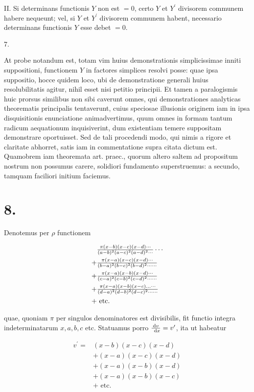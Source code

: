 \documentclass[twoside,12pt, showframe]{memoir}
\let\oldfrac\frac
\def\frac#1#2{\mathchoice{\tfrac{#1}{#2}}{\oldfrac{#1}{#2}}{\genfrac{}{}{}{2}{#1}{#2\mathstrut}}{\genfrac{}{}{}{3}{#1}{#2\mathstrut}}}
\begin{document}
II. Si determinans functionis \(Y\) non est \(=0\), certo \(Y\) et \(Y^{\prime}\) divisorem communem habere nequeunt; vel, si \(Y\) et \(Y^{\prime}\) divisorem communem habent, necessario determinans functionis \(Y\) esse debet \(=0\).

7.

At probe notandum est, totam vim huius demonstrationis simplicissimae inniti suppositioni, functionem \(Y\) in factores simplices resolvi posse: quae ipsa suppositio, hocce quidem loco, ubi de demonstratione generali huius resolubilitatis agitur, nihil esset nisi petitio principii. Et tamen a paralogismis huic prorsus similibus non sibi caverunt omnes, qui demonstrationes analyticas theorematis principalis tentaverunt, cuius speciosae illusionis originem iam in ipsa disquisitionis enunciatione animadvertimus, quum omnes in formam tantum radicum aequationum inquisiverint, dum existentiam temere suppositam demonstrare oportuisset. Sed de tali procedendi modo, qui nimis a rigore et claritate abhorret, satis iam in commentatione supra citata dictum est. Quamobrem iam theoremata art. praec.,
quorum altero saltem ad propositum nostrum non possumus carere, solidiori fundamento superstruemus: a secundo, tamquam faciliori initium faciemus.

\section*{8.}
Denotemus per \(\rho\) functionem

\[
\begin{aligned}
& \frac{\pi(x-b)(x-c)(x-d) \cdots}{(a-b)^{2}(a-c)^{2}(a-d)^{2} \cdots} \cdots \\
+ & \frac{\pi(x-a)(x-c)(x-d) \cdots}{(b-a)^{2}(b-c)^{2}(b-d)^{2} \cdots \cdots} \\
+ & \frac{\pi(x-a)(x-b)(x-d) \cdots}{(c-a)^{2}(c-b)^{2}(c-d)^{2} \cdots \cdots} \\
+ & \frac{\pi(x-a)(x-b)(x-c) \ldots \cdots}{(d-a)^{2}(d-b)^{2}(d-c)^{2} \cdots \cdots} \\
+ & \text { etc. }
\end{aligned}
\]

quae, quoniam \(\pi\) per singulos denominatores est divisibilis, fit functio integra indeterminatarum \(x, a, b, c\) etc. Statuamus porro \(\frac{\mathrm{d} v}{\mathrm{~d} x}=v^{\prime}\), ita ut habeatur

\[
\begin{aligned}
v^{\prime}= & (x-b)(x-c)(x-d) \\
& +(x-a)(x-c)(x-d) \\
& +(x-a)(x-b)(x-d) \\
& +(x-a)(x-b)(x-c) \\
& + \text { etc. }
\end{aligned}
\]
\end{document}
